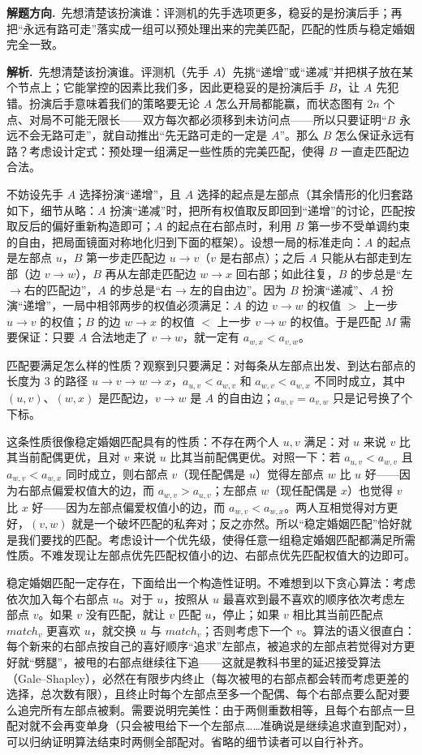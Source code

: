 \documentclass[UTF8,a4paper,11pt,oneside,openany,fontset=fandol]{ctexbook}
\theoremstyle{definition}
\newcommand{\sol}{\par\noindent\textbf{解析.}\ }
\newcommand{\hint}{\par\noindent\textbf{解题方向.}\ }
\begin{document}
\hint 先想清楚该扮演谁：评测机的先手选项更多，稳妥的是扮演后手；再把“永远有路可走”落实成一组可以预处理出来的完美匹配，匹配的性质与稳定婚姻完全一致。

\sol 先想清楚该扮演谁。评测机（先手 $A$）先挑“递增”或“递减”并把棋子放在某个节点上；它能掌控的因素比我们多，因此更稳妥的是扮演后手 $B$，让 $A$ 先犯错。扮演后手意味着我们的策略要无论 $A$ 怎么开局都能赢，而状态图有 $2n$ 个点、对局不可能无限长——双方每次都必须移到未访问点——所以只要证明“$B$ 永远不会无路可走”，就自动推出“先无路可走的一定是 $A$”。那么 $B$ 怎么保证永远有路？考虑设计定式：预处理一组满足一些性质的完美匹配，使得 $B$ 一直走匹配边合法。

不妨设先手 $A$ 选择扮演“递增”，且 $A$ 选择的起点是左部点（其余情形的化归套路如下，细节从略：$A$ 扮演“递减”时，把所有权值取反即回到“递增”的讨论，匹配按取反后的偏好重新构造即可；$A$ 的起点在右部点时，利用 $B$ 第一步不受单调约束的自由，把局面镜面对称地化归到下面的框架）。设想一局的标准走向：$A$ 的起点是左部点 $u$，$B$ 第一步走匹配边 $u\to v$（$v$ 是右部点）；之后 $A$ 只能从右部走到左部（边 $v\to w$），$B$ 再从左部走匹配边 $w\to x$ 回右部；如此往复，$B$ 的步总是“左$\to$右的匹配边”，$A$ 的步总是“右$\to$左的自由边”。因为 $B$ 扮演“递减”、$A$ 扮演“递增”，一局中相邻两步的权值必须满足：$A$ 的边 $v\to w$ 的权值 $>$ 上一步 $u\to v$ 的权值；$B$ 的边 $w\to x$ 的权值 $<$ 上一步 $v\to w$ 的权值。于是匹配 $M$ 需要保证：只要 $A$ 合法地走了 $v\to w$，就一定有 $a_{w,x}<a_{v,w}$。

匹配要满足怎么样的性质？观察到只要满足：对每条从左部点出发、到达右部点的长度为 $3$ 的路径 $u\to v\to w\to x$，$a_{u,v}<a_{w,v}$ 和 $a_{w,v}<a_{w,x}$ 不同时成立，其中 $(u,v)$、$(w,x)$ 是匹配边，$v\to w$ 是 $A$ 的自由边；$a_{w,v}=a_{v,w}$ 只是记号换了个下标。

这条性质很像稳定婚姻匹配具有的性质：不存在两个人 $u,v$ 满足：对 $u$ 来说 $v$ 比其当前配偶更优，且对 $v$ 来说 $u$ 比其当前配偶更优。对照一下：若 $a_{u,v}<a_{w,v}$ 且 $a_{w,v}<a_{w,x}$ 同时成立，则右部点 $v$（现任配偶是 $u$）觉得左部点 $w$ 比 $u$ 好——因为右部点偏爱权值大的边，而 $a_{w,v}>a_{u,v}$；左部点 $w$（现任配偶是 $x$）也觉得 $v$ 比 $x$ 好——因为左部点偏爱权值小的边，而 $a_{w,v}<a_{w,x}$。两人互相觉得对方更好，$(v,w)$ 就是一个破坏匹配的私奔对；反之亦然。所以“稳定婚姻匹配”恰好就是我们要找的匹配。考虑设计一个优先级，使得任意一组稳定婚姻匹配都满足所需性质。不难发现让左部点优先匹配权值小的边、右部点优先匹配权值大的边即可。

稳定婚姻匹配一定存在，下面给出一个构造性证明。不难想到以下贪心算法：考虑依次加入每个右部点 $u$。对于 $u$，按照从 $u$ 最喜欢到最不喜欢的顺序依次考虑左部点 $v$。如果 $v$ 没有匹配，就让 $v$ 匹配 $u$，停止；如果 $v$ 相比其当前匹配点 $match_v$ 更喜欢 $u$，就交换 $u$ 与 $match_v$；否则考虑下一个 $v$。算法的语义很直白：每个新来的右部点按自己的喜好顺序“追求”左部点，被追求的左部点若觉得对方更好就“劈腿”，被甩的右部点继续往下追——这就是教科书里的延迟接受算法（Gale--Shapley），必然在有限步内终止（每次被甩的右部点都会转而考虑更差的选择，总次数有限），且终止时每个左部点至多一个配偶、每个右部点要么配对要么追完所有左部点被剩。需要说明完美性：由于两侧重数相等，且每个右部点一旦配对就不会再变单身（只会被甩给下一个左部点……准确说是继续追求直到配对），可以归纳证明算法结束时两侧全部配对。省略的细节读者可以自行补齐。
\end{document}

